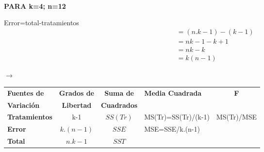 \documentclass[12pt,a4paper]{article}
\begin{document}
\begin{minipage}[t]{0.26\linewidth}
\vspace{14pt}
{\small
\textbf{PARA k=4; n=12}

Error=total-tratamientos
\begin{align*}
&= (n.k-1)-(k-1) \\[-1pt]
&= nk-1-k+1 \\[-1pt]
&= nk-k \\[-1pt]
&= k(n-1)
\end{align*}
\vspace{-14pt}

$\longrightarrow$
}
\end{minipage}\hfill
\begin{minipage}[t]{0.72\linewidth}
\vspace{0pt}
{\fontsize{8.8}{10.6}\selectfont
\setlength{\tabcolsep}{3.5pt}
\begin{tabular}{|l|c|c|l|c|}
\hline
\textbf{Fuentes de} & \textbf{Grados de} & \textbf{Suma de} & \textbf{Media Cuadrada} & \textbf{F} \\
\textbf{Variación} & \textbf{Libertad} & \textbf{Cuadrados} & & \\
\hline
\textbf{Tratamientos} & k-1 & $SS(Tr)$ & MS(Tr)=SS(Tr)/(k-1) & MS(Tr)/MSE \\
\hline
\textbf{Error} & $k.(n-1)$ & $SSE$ & MSE=SSE/k.(n-1) & \\
\hline
\textbf{Total} & $n.k-1$ & $SST$ & & \\
\hline
\end{tabular}
}
\end{minipage}
\end{document}
